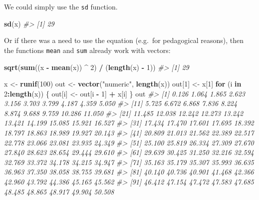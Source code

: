 \documentclass[]{book}
\newenvironment{Shaded}{\begin{snugshade}}{\end{snugshade}}
\newcommand{\CommentTok}[1]{\textcolor[rgb]{0.56,0.35,0.01}{\textit{#1}}}
\newcommand{\ControlFlowTok}[1]{\textcolor[rgb]{0.13,0.29,0.53}{\textbf{#1}}}
\newcommand{\DecValTok}[1]{\textcolor[rgb]{0.00,0.00,0.81}{#1}}
\newcommand{\KeywordTok}[1]{\textcolor[rgb]{0.13,0.29,0.53}{\textbf{#1}}}
\newcommand{\NormalTok}[1]{#1}
\newcommand{\OperatorTok}[1]{\textcolor[rgb]{0.81,0.36,0.00}{\textbf{#1}}}
\newcommand{\StringTok}[1]{\textcolor[rgb]{0.31,0.60,0.02}{#1}}
\theoremstyle{plain}
\theoremstyle{remark}
\theoremstyle{definition}
\theoremstyle{definition}
\theoremstyle{definition}
\theoremstyle{remark}
\begin{document}
We could simply use the \texttt{sd} function.

\begin{Shaded}
\begin{Highlighting}[]
\KeywordTok{sd}\NormalTok{(x)}
\CommentTok{#> [1] 29}
\end{Highlighting}
\end{Shaded}

Or if there was a need to use the equation (e.g.~for pedagogical
reasons), then the functions \texttt{mean} and \texttt{sum} already work
with vectors:

\begin{Shaded}
\begin{Highlighting}[]
\KeywordTok{sqrt}\NormalTok{(}\KeywordTok{sum}\NormalTok{((x }\OperatorTok{-}\StringTok{ }\KeywordTok{mean}\NormalTok{(x)) }\OperatorTok{^}\StringTok{ }\DecValTok{2}\NormalTok{) }\OperatorTok{/}\StringTok{ }\NormalTok{(}\KeywordTok{length}\NormalTok{(x) }\OperatorTok{-}\StringTok{ }\DecValTok{1}\NormalTok{))}
\CommentTok{#> [1] 29}
\end{Highlighting}
\end{Shaded}

\begin{Shaded}
\begin{Highlighting}[]
\NormalTok{x <-}\StringTok{ }\KeywordTok{runif}\NormalTok{(}\DecValTok{100}\NormalTok{)}
\NormalTok{out <-}\StringTok{ }\KeywordTok{vector}\NormalTok{(}\StringTok{"numeric"}\NormalTok{, }\KeywordTok{length}\NormalTok{(x))}
\NormalTok{out[}\DecValTok{1}\NormalTok{] <-}\StringTok{ }\NormalTok{x[}\DecValTok{1}\NormalTok{]}
\ControlFlowTok{for}\NormalTok{ (i }\ControlFlowTok{in} \DecValTok{2}\OperatorTok{:}\KeywordTok{length}\NormalTok{(x)) \{}
\NormalTok{  out[i] <-}\StringTok{ }\NormalTok{out[i }\OperatorTok{-}\StringTok{ }\DecValTok{1}\NormalTok{] }\OperatorTok{+}\StringTok{ }\NormalTok{x[i]}
\NormalTok{\}}
\NormalTok{out}
\CommentTok{#>   [1]  0.126  1.064  1.865  2.623  3.156  3.703  3.799  4.187  4.359  5.050}
\CommentTok{#>  [11]  5.725  6.672  6.868  7.836  8.224  8.874  9.688  9.759 10.286 11.050}
\CommentTok{#>  [21] 11.485 12.038 12.242 12.273 13.242 13.421 14.199 15.085 15.921 16.527}
\CommentTok{#>  [31] 17.434 17.470 17.601 17.695 18.392 18.797 18.863 18.989 19.927 20.143}
\CommentTok{#>  [41] 20.809 21.013 21.562 22.389 22.517 22.778 23.066 23.081 23.935 24.349}
\CommentTok{#>  [51] 25.100 25.819 26.334 27.309 27.670 27.840 28.623 28.654 29.444 29.610}
\CommentTok{#>  [61] 29.639 30.425 31.250 32.216 32.594 32.769 33.372 34.178 34.215 34.947}
\CommentTok{#>  [71] 35.163 35.179 35.307 35.993 36.635 36.963 37.350 38.058 38.755 39.681}
\CommentTok{#>  [81] 40.140 40.736 40.901 41.468 42.366 42.960 43.792 44.386 45.165 45.562}
\CommentTok{#>  [91] 46.412 47.154 47.472 47.583 47.685 48.485 48.865 48.917 49.904 50.508}
\end{Highlighting}
\end{Shaded}
\end{document}
